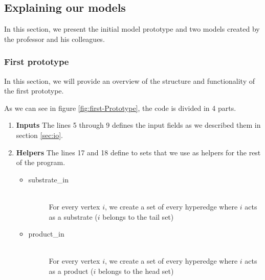 \subsection{Explaining our models}
In this section, we present the initial model prototype and two models created by the professor and his colleagues.
\subsubsection{First prototype}
In this section, we will provide an overview of the structure and functionality of the first prototype.

As we can see in figure \ref{fig:first-Prototype}, the code is divided in 4 parts.

\begin{enumerate}
    \item \textbf{Inputs} The lines 5 through 9 defines the input fields as we described them in section \ref{sec:io}.
    \item \textbf{Helpers} The lines 17 and 18 define to sets that we use as helpers for the rest of the program.
    \begin{itemize}
        \item
        \begin{description}
            \item[substrate\_in] ~\\ For every vertex $i$, we create a set of every hyperedge where $i$ acts as a substrate ($i$ belongs to the tail set)
        \end{description}
        \item
        \begin{description}
            \item[product\_in] ~\\ For every vertex $i$, we create a set of every hyperedge where $i$ acts as a product ($i$ belongs to the head set)
        \end{description}
    \end{itemize}
    

\end{enumerate}
